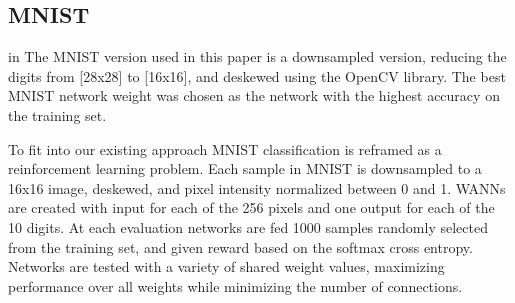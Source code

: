 \newpage
\subsection{MNIST}
 in
The MNIST version used in this paper is a downsampled version, reducing the digits from [28x28] to [16x16], and deskewed using the OpenCV library\cite{opencv_library}. The best MNIST network weight was chosen as the network with the highest accuracy on the training set.

To fit into our existing approach MNIST classification is reframed as a reinforcement learning problem. Each sample in MNIST is downsampled to a 16x16 image, deskewed, and pixel intensity normalized between 0 and 1. WANNs are created with input for each of the 256 pixels and one output for each of the 10 digits. At each evaluation networks are fed 1000 samples randomly selected from the training set, and given reward based on the softmax cross entropy. Networks are tested with a variety of shared weight values, maximizing performance over all weights while minimizing the number of connections.

